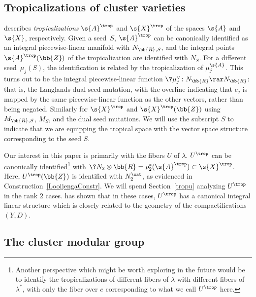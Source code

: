 \subsection{Tropicalizations of cluster varieties}\label{ClusterTrop}
\cite{FG1} describes {\it tropicalizations} $\s{A}^{\trop}$ and $\s{X}^{\trop}$ of the spaces $\s{A}$ and $\s{X}$, respectively. Given a seed~$S$, $\s{A}^{\trop}$ can be canonically identified as an integral piecewise-linear manifold with $N_{\bb{R},S}$, and the integral points $\s{A}^{\trop}(\bb{Z})$ of the tropicalization are identified with $N_S$. For a different seed~$\mu_j(S)$, the identification is related by the tropicalization of $\mu_j^{\s{A}}$. This turns out to be the integral piecewise-linear function $\?{\mu_j^{\vee}}\colon N_{\bb{R}}\rar N_{\bb{R}}$: that is, the Langlands dual seed mutation, with the overline indicating that $e_j$ is mapped by the same piecewise-linear function as the other vectors, rather than being negated. Similarly for $\s{X}^{\trop}$ and $\s{X}^{\trop}(\bb{Z})$ using $M_{\bb{R},S}$, $M_S$, and the dual seed mutations. We will use the subscript $S$ to indicate that we are equipping the tropical space with the vector space structure corresponding to the seed $S$.

Our interest in this paper is primarily with the fibers $U$ of $\lambda$. $U^{\trop}$ can be canonically identified\footnote{Another perspective which might be worth exploring in the future would be to identify the tropicalizations of different fibers of $\lambda$ with different fibers of $\lambda^*$, with only the fiber over $e$ corresponding to what we call $U^{\trop}$ here.} with $\?{N_2}\otimes \bb{R} = p_2^*(\s{A}^{\trop}) \subset \s{X}^{\trop}$. Here, $U^{\trop}(\bb{Z})$ is identified with $N_2^{\sat}$, as evidenced in Construction~\ref{LooijengaConstr}. We will spend Section~\ref{tropu} analyzing $U^{\trop}$ in the rank $2$ cases. \cite{GHK1} has shown that in these cases, $U^{\trop}$ has a canonical integral linear structure which is closely related to the geometry of the compactifications $(Y,D)$.

\subsection{The cluster modular group}\label{CMGdef}

